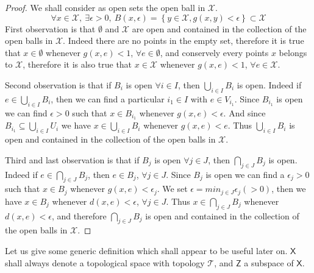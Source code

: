 \documentclass[11pt]{book}
\newcommand{\Tcal}{\mathcal{T}}
\newcommand{\Xcal}{\mathcal{X}}
\newcommand{\Xsf}{\mathsf{X}}
\newcommand{\Zsf}{\mathsf{Z}}
\theoremstyle{break}
\newtheorem{proof}{Proof}
\begin{document}
\begin{proof}
We shall consider as open sets the open ball in $\Xcal$.
%
\begin{equation*}
\forall x \in \Xcal , \ \exists \epsilon > 0, \ B(x,\epsilon) = \left\{ y \in \Xcal , g(x,y) < \epsilon \right\}\subset \Xcal
\end{equation*}
%
First observation is that $\emptyset$ and $\Xcal$ are open and contained in the collection of the open balls in $\Xcal$. Indeed there are no points in the empty set, therefore it is true that $x \in \emptyset$ whenever $g(x,e) < 1$, $\forall e \in \emptyset$, and conservely every points $x$ belongs to $\Xcal$, therefore it is also true that $x \in \Xcal$ whenever $g(x,e) < 1$,  $\forall e \in \Xcal$.\par%
%
Second observation is that if $B_i$ is open $\forall i \in I$, then $\bigcup_{i\in I} B_i$ is open. Indeed if $e \in \bigcup_{i\in I} B_i$, then we can find a particular $i_1 \in I$ with $e \in V_{i_1}$. Since $B_{i_1}$ is open we can find $\epsilon > 0$ such that $x \in B_{i_1}$ whenever $g(x,e) < \epsilon$. And since $B_{i_1} \subseteq \bigcup_{i\in I} U_i$ we have $x \in \bigcup_{i\in I} B_i$ whenever $g(x,e) <e$. Thus $\bigcup_{i\in I} B_i$ is open and contained in the collection of the open balls in $\Xcal$.\par%
%
Third and last observation is that if $B_j$ is open $\forall j \in J$, then $\bigcap_{j\in J} B_j$ is open. Indeed if $e \in \bigcap_{j \in J} B_j$, then $e \in B_j$, $\forall j \in J$. Since $B_j$ is open we can find a $\epsilon_j > 0$ such that $x \in B_j$ whenever $g(x,e) < \epsilon_j$. We set $\epsilon = min_{j\in J} \epsilon_j (>0)$, then we have $x \in B_j$ whenever $d(x,e) < \epsilon$, $\forall j \in J$. Thus $x \in \bigcap_{j\in J} B_j$ whenever $d(x,e) < \epsilon$, and therefore $\bigcap_{j\in J} B_j$ is open and contained in the collection of the open balls in $\Xcal$.\par%
\end{proof}


Let us give some generic definition which shall appear to be useful later on. $\Xsf$ shall always denote a topological space with topology $\Tcal$, and $\Zsf$ a subspace of $\Xsf$.%
\end{document}
